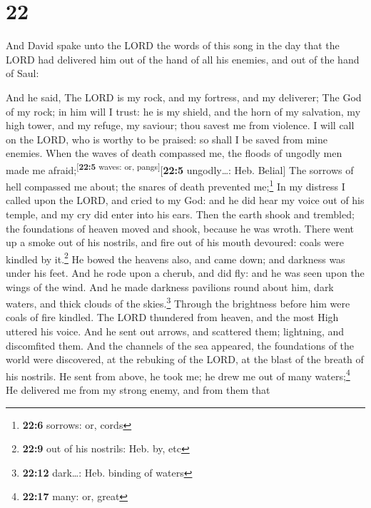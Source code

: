 \hypertarget{section-21}{%
\section{22}\label{section-21}}

 And David spake unto the LORD the words of this song in
the day that the LORD had delivered him out of the hand of all his
enemies, and out of the hand of Saul:

 And he said, The LORD is my rock, and my fortress, and my
deliverer;  The God of my rock; in him will I trust: he is
my shield, and the horn of my salvation, my high tower, and my refuge,
my saviour; thou savest me from violence.  I will call on
the LORD, who is worthy to be praised: so shall I be saved from mine
enemies.  When the waves of death compassed me, the floods
of ungodly men made me afraid;\textsuperscript{{[}\textbf{22:5} waves:
or, pangs{]}}{[}\textbf{22:5} ungodly\ldots: Heb. Belial{]}
 The sorrows of hell compassed me about; the snares of
death prevented me;\footnote{\textbf{22:6} sorrows: or, cords}
 In my distress I called upon the LORD, and cried to my
God: and he did hear my voice out of his temple, and my cry did enter
into his ears.  Then the earth shook and trembled; the
foundations of heaven moved and shook, because he was wroth.
 There went up a smoke out of his nostrils, and fire out
of his mouth devoured: coals were kindled by it.\footnote{\textbf{22:9}
  out of his nostrils: Heb. by, etc}  He bowed the
heavens also, and came down; and darkness was under his feet.
 And he rode upon a cherub, and did fly: and he was seen
upon the wings of the wind.  And he made darkness
pavilions round about him, dark waters, and thick clouds of the
skies.\footnote{\textbf{22:12} dark\ldots: Heb. binding of waters}
 Through the brightness before him were coals of fire
kindled.  The LORD thundered from heaven, and the most
High uttered his voice.  And he sent out arrows, and
scattered them; lightning, and discomfited them.  And the
channels of the sea appeared, the foundations of the world were
discovered, at the rebuking of the LORD, at the blast of the breath of
his nostrils.  He sent from above, he took me; he drew me
out of many waters;\footnote{\textbf{22:17} many: or, great}
 He delivered me from my strong enemy, and from them that
